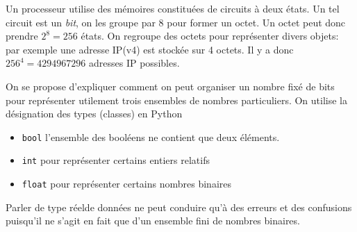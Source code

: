 


Un processeur utilise des mémoires constituées de circuits à deux états. Un tel circuit est un \emph{bit}, on les groupe par 8 pour former un octet. Un octet peut donc prendre $2^8=256$ états.\newline
On regroupe des octets pour représenter divers objets: par exemple une adresse IP(v4) est stockée sur 4 octets. Il y a donc $256^4 = 4294967296$ adresses IP possibles.

On se propose d'expliquer comment on peut organiser un nombre fixé de bits pour représenter utilement trois ensembles de nombres particuliers. On utilise la désignation des types (classes) en Python
\begin{itemize}
  \item \texttt{bool} l'ensemble des booléens ne contient que deux éléments.
  \item \texttt{int} pour représenter certains entiers relatifs
  \item \texttt{float} pour représenter certains nombres binaires
\end{itemize}
Parler de type \og réel\fg de données ne peut conduire qu'à des erreurs et des confusions puisqu'il ne s'agit en fait que d'un ensemble fini de nombres binaires. 

